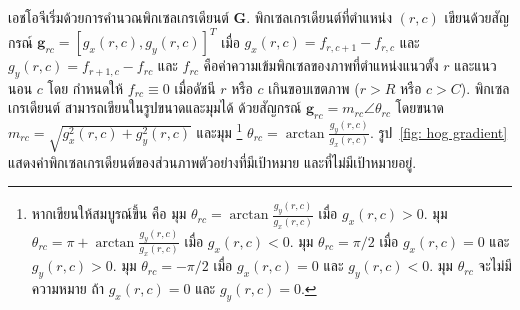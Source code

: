 เอชโอจีเริ่มด้วยการคำนวณพิกเซลเกรเดียนต์ $\bm{G}$. %
พิกเซลเกรเดียนต์ที่ตำแหน่ง $(r,c)$ เขียนด้วยสัญกรณ์ $\bm{g}_{rc} =[g_x(r,c), g_y(r,c)]^T$ 
เมื่อ $g_x(r,c) =f_{r,c+1} - f_{r,c}$ และ $g_y(r,c) = f_{r+1,c} - f_{rc}$
และ $f_{rc}$ คือค่าความเข้มพิกเซลของภาพที่ตำแหน่งแนวตั้ง $r$ และแนวนอน $c$
โดย กำหนดให้ $f_{rc} \equiv 0$ เมื่อดัชนี $r$ หรือ $c$ เกินขอบเขตภาพ ($r > R$ หรือ $c > C$). 
%
พิกเซลเกรเดียนต์ สามารถเขียนในรูปขนาดและมุมได้ ด้วยสัญกรณ์ $\bm{g}_{rc} = m_{rc} \angle \theta_{rc}$ 
โดยขนาด $m_{rc} = \sqrt{g_x^2(r,c) + g_y^2(r,c)}$ และมุม%
\footnote{%
หากเขียนให้สมบูรณ์ขึ้น คือ มุม $\theta_{rc} = \arctan \frac{g_y(r,c)}{g_x(r,c)}$ เมื่อ $g_x(r,c) > 0$.
มุม $\theta_{rc} = \pi + \arctan \frac{g_y(r,c)}{g_x(r,c)}$ เมื่อ $g_x(r,c) < 0$.
มุม  $\theta_{rc} = \pi/2$ เมื่อ $g_x(r,c) = 0$ และ $g_y(r,c) > 0$.
มุม $\theta_{rc} = -\pi/2$ เมื่อ $g_x(r,c) = 0$ และ $g_y(r,c) < 0$.
มุม $\theta_{rc}$ จะไม่มีความหมาย ถ้า $g_x(r,c) = 0$ และ $g_y(r,c) = 0$.
}	
$\theta_{rc} = \arctan \frac{g_y(r,c)}{g_x(r,c)}$.
รูป~\ref{fig: hog gradient} แสดงค่าพิกเซลเกรเดียนต์ของส่วนภาพตัวอย่างที่มีเป้าหมาย และที่ไม่มีเป้าหมายอยู่.


